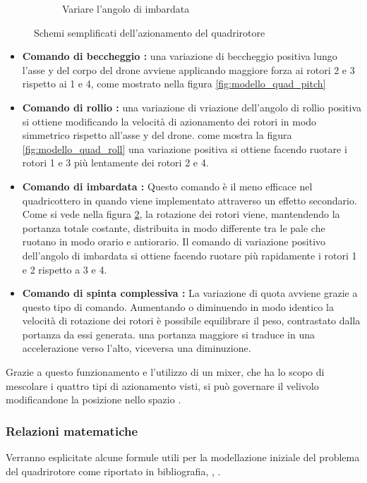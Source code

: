 \begin{figure}
\begin{subfigure}{0.45\textwidth}
		\caption{Variare l'angolo di imbardata}
		\label{fig:modello_quad_yaw}
	\end{subfigure}
	\caption{Schemi semplificati dell'azionamento del quadrirotore}
\end{figure}
\begin{itemize}
	\item \textbf{Comando di beccheggio : } una variazione di beccheggio positiva lungo l'asse y del corpo del drone avviene applicando maggiore forza ai rotori 2 e 3 rispetto ai 1 e 4, come mostrato nella figura \ref{fig:modello_quad_pitch}
	\item \textbf{Comando di rollio : } una variazione di vriazione dell'angolo di rollio positiva si ottiene modificando la velocità di azionamento dei rotori in modo simmetrico rispetto all'asse y del drone. come mostra la figura \ref{fig:modello_quad_roll} una variazione positiva si ottiene facendo ruotare i rotori 1 e 3 più lentamente dei rotori 2 e 4.
	\item \textbf{Comando di imbardata : } Questo comando è il meno efficace nel quadricottero in quando viene implementato attraverso un effetto secondario. Come si vede nella figura \ref{fig:modello_quad_yaw}, la rotazione dei rotori viene, mantendendo la portanza totale costante, distribuita in modo differente tra le pale che ruotano in modo orario e antiorario. Il comando di variazione positivo dell'angolo di imbardata si ottiene facendo ruotare più rapidamente i rotori 1 e 2 rispetto a 3 e 4.
	\item \textbf{Comando di spinta complessiva : } La variazione di quota avviene grazie a questo tipo di comando. Aumentando o diminuendo in modo identico la velocità di rotazione dei rotori è possibile equilibrare il peso, contrastato dalla portanza da essi generata. una portanza maggiore si traduce in una accelerazione verso l'alto, viceversa una diminuzione.
\end{itemize}
Grazie a questo funzionamento e l'utilizzo di un mixer, che ha lo scopo di mescolare i quattro tipi di azionamento visti, si può governare il velivolo modificandone la posizione nello spazio \cite{DesTestCarm}.
\subsubsection{Relazioni matematiche}
Verranno esplicitate alcune formule utili per la modellazione iniziale del problema del quadrirotore come riportato in bibliografia, \cite{DesTestCarm}, \cite{baseTesi}.

